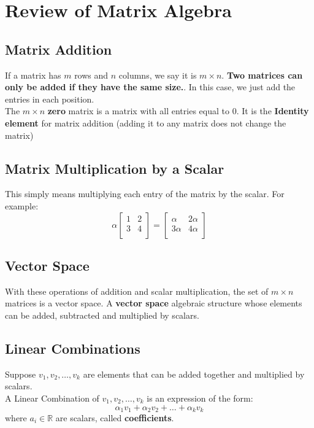 \documentclass[a4paper, 9pt]{extarticle}
\begin{document}
\pagebreak
\small
\tableofcontents
\pagebreak
\normalsize
\section{Review of Matrix Algebra}
\subsection*{Matrix Addition}
If a matrix has $m$ rows and $n$ columns, we say it is $m \times n$. \textbf{Two matrices can only be added if they have the same size.}. In this case, we just add the entries in each position. \\[1.5ex]
The $m \times n$ \textbf{zero} matrix is a matrix with all entries equal to $0$. It is the \textbf{Identity element} for matrix addition (adding it to any matrix does not change the matrix)
\subsection*{Matrix Multiplication by a Scalar}
This simply means multiplying each entry of the matrix by the scalar. For example:
$$
  \alpha \begin{bmatrix}
    1 & 2 \\
    3 & 4 \\
  \end{bmatrix}
  =
  \begin{bmatrix}
    \alpha  & 2\alpha \\
    3\alpha & 4\alpha \\
  \end{bmatrix}
$$
\subsection*{Vector Space}
With these operations of addition and scalar multiplication, the set of
$m \times n$ matrices is a vector space. A \textbf{vector space} algebraic structure whose elements can be added, subtracted and multiplied by scalars.

\subsection*{Linear Combinations}
Suppose $v_1, v_2, \dots, v_k$ are elements that can be added together and multiplied by scalars. \\[2ex]
A Linear Combination of $v_1, v_2, \dots, v_k$ is an expression of the form:
$$
  \alpha_1 v_1 + \alpha_2 v_2 + \ldots + \alpha_k v_k
$$
where $a_i \in \mathbb{R}$ are scalars, called \textbf{coefficients}.
\end{document}
